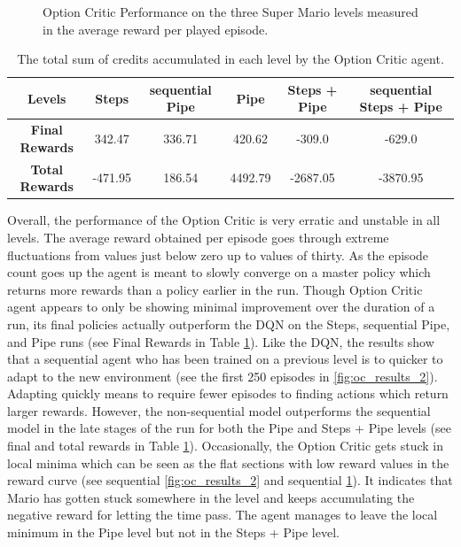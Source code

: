 \documentclass[notitlepage,a4paper,11pt]{article}
\begin{document}
\begin{figure}[htb!]
\begin{subfigure}[t]{0.32\textwidth}
         \caption{}
         \label{fig:oc_results_3}
     \end{subfigure}
        \caption{Option Critic Performance on the three Super Mario levels measured in the average reward per played episode.}
        \label{fig:oc_results}
\end{figure}

\begin{table}[htb!]
\centering
\begin{tabular}{ |c|c|c|c|c|c| } 
	\hline
	\textbf{Levels} & Steps & sequential Pipe  & Pipe & Steps + Pipe & sequential Steps + Pipe \\
	\hline
	\textbf{Final Rewards} & 342.47 & 336.71 & 420.62 & -309.0 & -629.0\\
	\hline
	\textbf{Total Rewards} & -471.95 & 186.54 & 4492.79 &  -2687.05 & -3870.95 \\
	\hline
\end{tabular}
\caption{The total sum of credits accumulated in each level by the Option Critic agent.}
\label{tbl:oc_rewards}
\end{table}

Overall, the performance of the Option Critic is very erratic and unstable in all levels. The average reward obtained per episode goes through extreme fluctuations from values just below zero up to values of thirty. As the episode count goes up the agent is meant to slowly converge on a master policy which returns more rewards than a policy earlier in the run. Though Option Critic agent appears to only be showing minimal improvement over the duration of a run, its final policies actually outperform the DQN on the Steps, sequential Pipe, and Pipe runs (see Final Rewards in Table \ref{tbl:oc_rewards}). Like the DQN, the results show that a sequential agent who has been trained on a previous level is to quicker to adapt to the new environment (see the first 250 episodes in \ref{fig:oc_results_2}). Adapting quickly means to require fewer episodes to finding actions which return larger rewards. However, the non-sequential model outperforms the sequential model in the late stages of the run for both the Pipe and Steps + Pipe levels (see final and total rewards in Table \ref{tbl:oc_rewards}). Occasionally, the Option Critic gets stuck in local minima which can be seen as the flat sections with low reward values in the reward curve (see sequential \ref{fig:oc_results_2} and sequential \ref{fig:oc_results_3}). It indicates that Mario has gotten stuck somewhere in the level and keeps accumulating the negative reward for letting the time pass. The agent manages to leave the local minimum in the Pipe level but not in the Steps + Pipe level.
\end{document}
